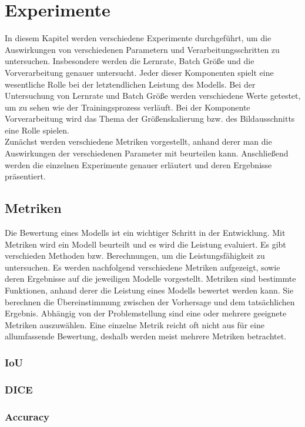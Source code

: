 \chapter{Experimente}
In diesem Kapitel werden verschiedene Experimente durchgeführt, um die Auswirkungen von verschiedenen Parametern und Verarbeitungsschritten zu untersuchen. Insbesondere werden die Lernrate, Batch Größe und die Vorverarbeitung genauer untersucht. Jeder dieser Komponenten spielt eine wesentliche Rolle bei der letztendlichen Leistung des \gls{Modell}s. Bei der Untersuchung von Lernrate und Batch Größe werden verschiedene Werte getestet, um zu sehen wie der Trainingsprozess verläuft. Bei der Komponente Vorverarbeitung wird das Thema der Größenskalierung bzw. des Bildausschnitts eine Rolle spielen.\\
Zunächst werden verschiedene Metriken vorgestellt, anhand derer man die Auswirkungen der verschiedenen Parameter mit beurteilen kann. Anschließend werden die einzelnen Experimente genauer erläutert und deren Ergebnisse präsentiert.

\section{Metriken}
Die Bewertung eines \gls{Modell}s ist ein wichtiger Schritt in der Entwicklung. Mit Metriken wird ein \gls{Modell} beurteilt und es wird die Leistung evaluiert. Es gibt verschieden Methoden bzw. Berechnungen, um die Leistungsfähigkeit zu untersuchen. Es werden nachfolgend verschiedene Metriken aufgezeigt, sowie deren Ergebnisse auf die jeweiligen \gls{Modell}e vorgestellt.
Metriken sind bestimmte Funktionen, anhand derer die Leistung eines \glspl{Modell} bewertet werden kann. Sie berechnen die Übereinstimmung zwischen der Vorhersage und dem tatsächlichen Ergebnis. Abhängig von der Problemstellung sind eine oder mehrere geeignete Metriken auszuwählen. Eine einzelne Metrik reicht oft nicht aus für eine allumfassende Bewertung, deshalb werden meist mehrere Metriken betrachtet.
\subsection{IoU}
\subsection{DICE}
\subsection{Accuracy}
